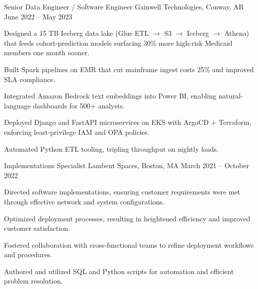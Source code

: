 \begin{cventries}

\cventry
{Senior Data Engineer / Software Engineer} %
{Gainwell Technologies, Conway, AR} %
{} %
{June 2022 -- May 2023} %
{ %
\begin{cvitems}
\item {Designed a 15 TB Iceberg data lake (Glue ETL $\rightarrow$ S3 $\rightarrow$ Iceberg $\rightarrow$ Athena) that feeds cohort-prediction models surfacing 30\% more high-risk Medicaid members one month sooner.}
\item {Built Spark pipelines on EMR that cut mainframe ingest costs 25\% and improved SLA compliance.}
\item {Integrated Amazon Bedrock text embeddings into Power BI, enabling natural-language dashboards for 500+ analysts.}
\item {Deployed Django and FastAPI microservices on EKS with ArgoCD + Terraform, enforcing least-privilege IAM and OPA policies.}
\item {Automated Python ETL tooling, tripling throughput on nightly loads.}
\end{cvitems}
}


\cventry
{Implementations Specialist} %
{Lambent Spaces, Boston, MA} %
{} %
{March 2021 – October 2022} %
{ %
\begin{cvitems}
\item {Directed software implementations, ensuring customer requirements were met through effective network and system configurations.}
\item {Optimized deployment processes, resulting in heightened efficiency and improved customer satisfaction.}
\item {Fostered collaboration with cross-functional teams to refine deployment workflows and procedures.}
\item {Authored and utilized SQL and Python scripts for automation and efficient problem resolution.}
\end{cvitems}
}



\end{cventries}
